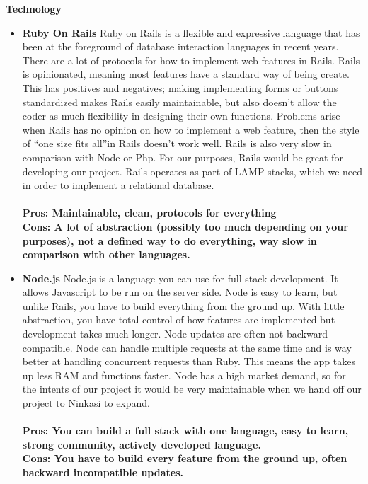 \documentclass[draftclsnofoot,onecolumn,letterpaper,10pt]{IEEEtran}
\begin{document}
		\textbf{Technology}
			\begin{itemize}
				\item{\textbf{Ruby On Rails}}
					Ruby on Rails is a flexible and expressive language that has been at the foreground of database interaction languages in recent years.
					There are a lot of protocols for how to implement web features in Rails.
					Rails is opinionated, meaning most features have a standard way of being create\cite{Medium}.
					This has positives and negatives; making implementing forms or buttons standardized makes Rails easily maintainable, but also doesn't allow the coder as much flexibility in designing their own functions.
					Problems arise when Rails has no opinion on how to implement a web feature, then the style of \textquotedblleft one size fits all\textquotedblright in Rails doesn't work well\cite{Medium}.
					Rails is also very slow in comparison with Node or Php\cite{Medium}.
					For our purposes, Rails would be great for developing our project.
					Rails operates as part of LAMP stacks, which we need in order to implement a relational database.
					\\ \\
					\textbf{Pros: Maintainable, clean, protocols for everything}
					\\
					\textbf{Cons: A lot of abstraction (possibly too much depending on your purposes), not a defined way to do everything, way slow in comparison with other languages.}


				\item{\textbf{Node.js}}
					Node.js is a language you can use for full stack development\cite{Medium}.
					It allows Javascript to be run on the server side\cite{Medium}.
					Node is easy to learn, but unlike Rails, you have to build everything from the ground up\cite{NetGuru}.
					With little abstraction, you have total control of how features are implemented but development takes much longer.
					Node updates are often not backward compatible.
					Node can handle multiple requests at the same time and is way better at handling concurrent requests than Ruby\cite{Medium}.
					This means the app takes up less RAM and functions faster.
					Node has a high market demand, so for the intents of our project it would be very maintainable when we hand off our project to Ninkasi to expand.
					\\ \\
					\textbf{Pros: You can build a full stack with one language, easy to learn, strong community, actively developed language.}
					\\
					\textbf{Cons: You have to build every feature from the ground up, often backward incompatible updates.}



\end{itemize}
\end{document}
